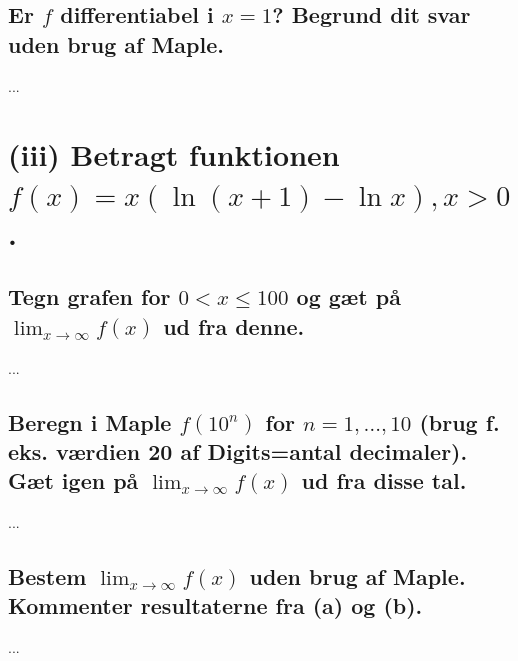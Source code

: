 \documentclass[11pt,a4paper]{article}
\newcommand{\limit}[2]{\lim_{#1 \rightarrow #2}}
\begin{document}
\subsection
{
    \mdseries
    Er $f$ differentiabel i $x=1$? Begrund dit svar uden brug af Maple.
}
...


\section
{
    (iii) \mdseries
    Betragt funktionen $f(x) = x(\ln(x + 1) - \ln x), x > 0$.
}

\subsection
{
    \mdseries
    Tegn grafen for $0 < x \leq 100$ og gæt på $\limit{x}{\infty} f(x)$ ud
    fra denne.
}
...

\subsection
{
    \mdseries
    Beregn i Maple $f(10^n)$ for $n = 1, \dots, 10$ (brug f. eks. værdien 20
    af Digits=antal decimaler). Gæt igen på $\limit{x}{\infty} f(x)$ ud fra
    disse tal.
}
...

\subsection
{
    \mdseries
    Bestem $\limit{x}{\infty} f(x)$ uden brug af Maple. Kommenter resultaterne
    fra (a) og (b).
}
...
\end{document}
